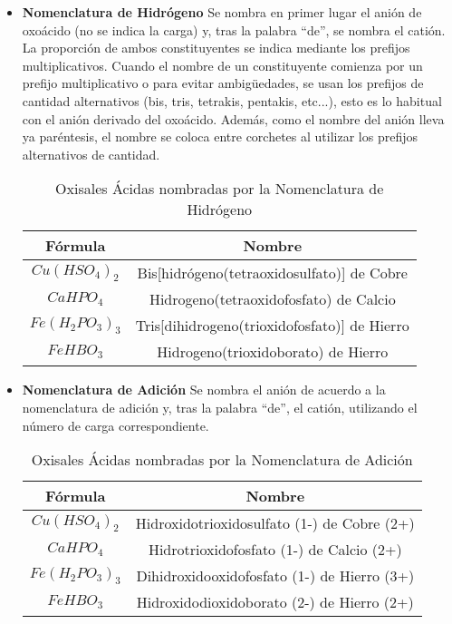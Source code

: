 \begin{itemize}
	\item\textbf{Nomenclatura de Hidrógeno} Se nombra en primer lugar el anión de oxoácido (no se indica la carga) y, tras la palabra “de”, se nombra el catión. La proporción de ambos constituyentes se indica mediante los prefijos multiplicativos. Cuando el nombre de un constituyente comienza por un prefijo multiplicativo o para evitar ambigüedades, se usan los prefijos de cantidad alternativos (bis, tris, tetrakis, pentakis, etc...), esto es lo habitual con el anión derivado del oxoácido. Además, como el nombre del anión lleva ya paréntesis, el nombre se coloca entre corchetes al utilizar los prefijos alternativos de cantidad.\\
	\begin{table}[h!]
		\centering
		\begin{tabular}{c|c}
			Fórmula&Nombre\\ \hline
			$Cu(HSO_4)_2$&Bis[hidrógeno(tetraoxidosulfato)] de Cobre\\
			$CaHPO_4$&Hidrogeno(tetraoxidofosfato) de Calcio\\
			$Fe(H_2PO_3)_3$&Tris[dihidrogeno(trioxidofosfato)] de Hierro \\
			$FeHBO_3$&Hidrogeno(trioxidoborato) de Hierro \\ \hline
		\end{tabular}
			\caption{Oxisales Ácidas nombradas por la Nomenclatura de Hidrógeno}
	\end{table}
	\item\textbf{Nomenclatura de Adición} Se nombra el anión de acuerdo a la nomenclatura de adición y, tras la palabra “de”, el catión, utilizando el número de carga correspondiente.\\
		\begin{table}[h!]
		\centering
		\begin{tabular}{c|c}
			Fórmula&Nombre\\ \hline
			$Cu(HSO_4)_2$&Hidroxidotrioxidosulfato (1-) de Cobre (2+)\\
			$CaHPO_4$&Hidrotrioxidofosfato (1-) de Calcio (2+)\\
			$Fe(H_2PO_3)_3$&Dihidroxidooxidofosfato (1-) de Hierro (3+)\\
			$FeHBO_3$&Hidroxidodioxidoborato (2-) de Hierro (2+)\\ \hline
		\end{tabular}
			\caption{Oxisales Ácidas nombradas por la Nomenclatura de Adición}
	\end{table}
\end{itemize}
\newpage
